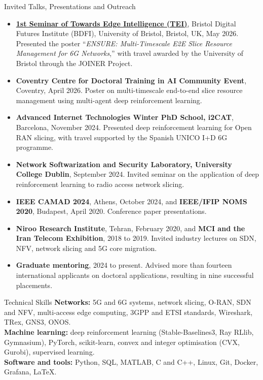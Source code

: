 \documentclass{resume}
\begin{document}
\begin{rSection}{Invited Talks, Presentations and Outreach}
\begin{itemize}
  \item \textbf{\href{https://extend-lab.github.io/TEI/\#posters}{1st Seminar of Towards Edge Intelligence (TEI)}}, Bristol Digital Futures Institute (BDFI), University of Bristol, Bristol, UK, May 2026. Presented the poster ``\textit{ENSURE: Multi-Timescale E2E Slice Resource Management for 6G Networks},'' with travel awarded by the University of Bristol through the JOINER Project.
  \item \textbf{Coventry Centre for Doctoral Training in AI Community Event}, Coventry, April 2026. Poster on multi-timescale end-to-end slice resource management using multi-agent deep reinforcement learning.
  \item \textbf{Advanced Internet Technologies Winter PhD School, i2CAT}, Barcelona, November 2024. Presented deep reinforcement learning for Open RAN slicing, with travel supported by the Spanish UNICO I+D 6G programme.
  \item \textbf{Network Softwarization and Security Laboratory, University College Dublin}, September 2024. Invited seminar on the application of deep reinforcement learning to radio access network slicing.
  \item \textbf{IEEE CAMAD 2024}, Athens, October 2024, and \textbf{IEEE/IFIP NOMS 2020}, Budapest, April 2020. Conference paper presentations.
  \item \textbf{Niroo Research Institute}, Tehran, February 2020, and \textbf{MCI and the Iran Telecom Exhibition}, 2018 to 2019. Invited industry lectures on SDN, NFV, network slicing and 5G core migration.
  \item \textbf{Graduate mentoring}, 2024 to present. Advised more than fourteen international applicants on doctoral applications, resulting in nine successful placements.
\end{itemize}
\end{rSection}

\begin{rSection}{Technical Skills}
\textbf{Networks:} 5G and 6G systems, network slicing, O-RAN, SDN and NFV, multi-access edge computing, 3GPP and ETSI standards, Wireshark, TRex, GNS3, ONOS.\\
\textbf{Machine learning:} deep reinforcement learning (Stable-Baselines3, Ray RLlib, Gymnasium), PyTorch, scikit-learn, convex and integer optimisation (CVX, Gurobi), supervised learning.\\
\textbf{Software and tools:} Python, SQL, MATLAB, C and C++, Linux, Git, Docker, Grafana, \LaTeX.
\end{rSection}
\end{document}

